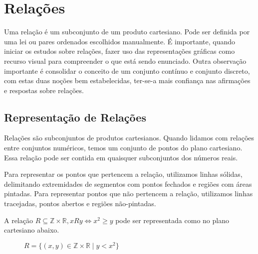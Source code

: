 \chapter{Relações}
Uma relação é um subconjunto de um produto cartesiano. Pode ser definida por uma lei ou pares ordenados escolhidos manualmente. É importante, quando iniciar os estudos sobre relações, fazer uso das representações gráficas como recurso visual para compreender o que está sendo enunciado. Outra observação importante é consolidar o conceito de um conjunto contínuo e conjunto discreto, com estas duas noções bem estabelecidas, ter-se-a mais confiança nas afirmações e respostas sobre relações.

\section{Representação de Relações}
Relações são subconjuntos de produtos cartesianos. Quando lidamos com relações entre conjuntos numéricos, temos um conjunto de pontos do plano cartesiano. Essa relação pode ser contida em quaisquer subconjuntos dos números reais. \par 
Para representar os pontos que pertencem a relação, utilizamos linhas sólidas, delimitando extremidades de segmentos com pontos fechados e regiões com áreas pintadas. Para representar pontos que não pertencem a relação, utilizamos linhas tracejadas, pontos abertos e regiões não-pintadas.

\begin{exemplo}
A relação $R \subseteq \mathbb{Z} \times \mathbb{R}, xRy \Leftrightarrow x^2 \ge y$ pode ser representada como no plano cartesiano abaixo.
\begin{figure}[H] 
\centering
    \caption[Exemplo de Relação]{$R=\{(x,y) \in \mathbb{Z} \times \mathbb{R} \mid y<x^2\}$}
\end{figure}
\end{exemplo}

